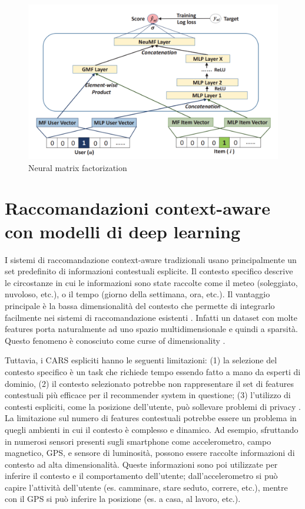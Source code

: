 \documentclass[12pt,italian]{report}
\begin{document}
\begin{figure}
  \includegraphics[width=\linewidth]{immagini/neumf.png}
  \caption{Neural matrix factorization}
  \label{fig:neumf}
\end{figure}

\section{Raccomandazioni context-aware con modelli di deep learning}
I sistemi di raccomandazione context-aware tradizionali usano principalmente un set predefinito di informazioni contestuali esplicite. Il contesto specifico descrive le circostanze in cui le informazioni sono state raccolte come il meteo (soleggiato, nuvoloso, etc.), o il tempo (giorno della settimana, ora, etc.). Il vantaggio principale è la bassa dimensionalità del contesto che permette di integrarlo facilmente nei sistemi di raccomandazione esistenti \cite{context-aware-deep-learning}. Infatti un dataset con molte features porta naturalmente ad uno spazio multidimensionale e quindi a sparsità. Questo fenomeno è conosciuto come curse of dimensionality \cite{curse-of-dim-CARS}.

Tuttavia, i CARS espliciti hanno le seguenti limitazioni: (1) la selezione del contesto specifico è un task che richiede tempo essendo fatto a mano da esperti di dominio, (2) il contesto selezionato potrebbe non rappresentare il set di features contestuali più efficace per il recommender system in questione; (3) l'utilizzo di contesti espliciti, come la posizione dell'utente, può sollevare problemi di privacy  \cite{context-aware-deep-learning}. La limitazione sul numero di features contestuali potrebbe essere un problema in quegli ambienti in cui il contesto è complesso e dinamico. Ad esempio, sfruttando in numerosi sensori presenti sugli smartphone come accelerometro, campo magnetico, GPS, e sensore di luminosità, possono essere raccolte informazioni di contesto ad alta dimensionalità. Queste informazioni sono poi utilizzate per inferire il contesto e il comportamento dell'utente; dall'accelerometro si può capire l'attività dell'utente (es. camminare, stare seduto, correre, etc.), mentre con il GPS si può inferire la posizione (es. a casa, al lavoro, etc.).
\end{document}
